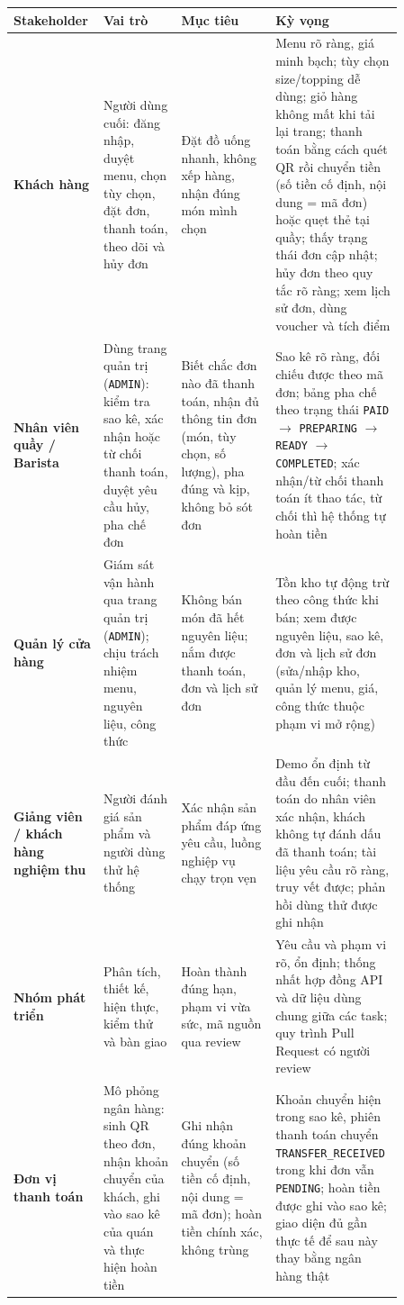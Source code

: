 {\small\renewcommand{\arraystretch}{1.25}
\begin{longtable}{@{}p{0.14\linewidth}p{0.19\linewidth}p{0.23\linewidth}p{0.30\linewidth}@{}}
\toprule
\textbf{Stakeholder} & \textbf{Vai trò} & \textbf{Mục tiêu} & \textbf{Kỳ vọng} \\
\midrule
\endhead
\bottomrule
\endfoot
\textbf{Khách hàng} & Người dùng cuối: đăng nhập, duyệt menu, chọn tùy chọn, đặt đơn, thanh toán, theo dõi và hủy đơn & Đặt đồ uống nhanh, không xếp hàng, nhận đúng món mình chọn & Menu rõ ràng, giá minh bạch; tùy chọn size/topping dễ dùng; giỏ hàng không mất khi tải lại trang; thanh toán bằng cách quét QR rồi chuyển tiền (số tiền cố định, nội dung = mã đơn) hoặc quẹt thẻ tại quầy; thấy trạng thái đơn cập nhật; hủy đơn theo quy tắc rõ ràng; xem lịch sử đơn, dùng voucher và tích điểm \\[4pt]
\textbf{Nhân viên quầy / Barista} & Dùng trang quản trị (\texttt{ADMIN}): kiểm tra sao kê, xác nhận hoặc từ chối thanh toán, duyệt yêu cầu hủy, pha chế đơn & Biết chắc đơn nào đã thanh toán, nhận đủ thông tin đơn (món, tùy chọn, số lượng), pha đúng và kịp, không bỏ sót đơn & Sao kê rõ ràng, đối chiếu được theo mã đơn; bảng pha chế theo trạng thái \texttt{PAID} $\rightarrow$ \texttt{PREPARING} $\rightarrow$ \texttt{READY} $\rightarrow$ \texttt{COMPLETED}; xác nhận/từ chối thanh toán ít thao tác, từ chối thì hệ thống tự hoàn tiền \\[4pt]
\textbf{Quản lý cửa hàng} & Giám sát vận hành qua trang quản trị (\texttt{ADMIN}); chịu trách nhiệm menu, nguyên liệu, công thức & Không bán món đã hết nguyên liệu; nắm được thanh toán, đơn và lịch sử đơn & Tồn kho tự động trừ theo công thức khi bán; xem được nguyên liệu, sao kê, đơn và lịch sử đơn (sửa/nhập kho, quản lý menu, giá, công thức thuộc phạm vi mở rộng) \\[4pt]
\textbf{Giảng viên / khách hàng nghiệm thu} & Người đánh giá sản phẩm và người dùng thử hệ thống & Xác nhận sản phẩm đáp ứng yêu cầu, luồng nghiệp vụ chạy trọn vẹn & Demo ổn định từ đầu đến cuối; thanh toán do nhân viên xác nhận, khách không tự đánh dấu đã thanh toán; tài liệu yêu cầu rõ ràng, truy vết được; phản hồi dùng thử được ghi nhận \\[4pt]
\textbf{Nhóm phát triển} & Phân tích, thiết kế, hiện thực, kiểm thử và bàn giao & Hoàn thành đúng hạn, phạm vi vừa sức, mã nguồn qua review & Yêu cầu và phạm vi rõ, ổn định; thống nhất hợp đồng API và dữ liệu dùng chung giữa các task; quy trình Pull Request có người review \\[4pt]
\textbf{Đơn vị thanh toán} & Mô phỏng ngân hàng: sinh QR theo đơn, nhận khoản chuyển của khách, ghi vào sao kê của quán và thực hiện hoàn tiền & Ghi nhận đúng khoản chuyển (số tiền cố định, nội dung = mã đơn); hoàn tiền chính xác, không trùng & Khoản chuyển hiện trong sao kê, phiên thanh toán chuyển \texttt{TRANSFER\_RECEIVED} trong khi đơn vẫn \texttt{PENDING}; hoàn tiền được ghi vào sao kê; giao diện đủ gần thực tế để sau này thay bằng ngân hàng thật \\[4pt]
\end{longtable}}

